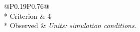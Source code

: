 \begin{longtable}{@{}P{0.19\textwidth}P{0.76\textwidth}@{}}
\toprule
{}\\*
Criterion & 4 \\*
Observed & \textit{Units: simulation conditions.} \\[0.6em]
\midrule
\bottomrule
\end{longtable}
